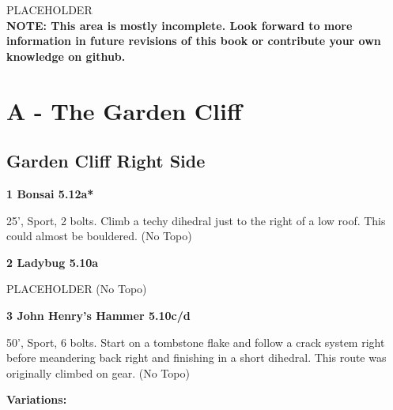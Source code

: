 \begin{multicols}{2}



PLACEHOLDER\\

\textbf{NOTE: This area is mostly incomplete. Look forward to more information in future revisions of this book or contribute your own knowledge on github.}\\


\newpage

\section{A - The Garden Cliff}\label{sa:The Garden Cliff}




\needspace{1.5cm}
\subsection*{Garden Cliff Right Side}\label{bf:Garden Cliff Right Side}
	


\needspace{1.5cm}
\label{rt:Bonsai}
\colorbox{Goldenrod!50}{
\parbox{0.95\linewidth}{
\textbf{
1 Bonsai 5.12a*  
}}}
\begin{adjustwidth}{0.5cm}{}			
25', Sport, 2 bolts. Climb a techy dihedral just to the right of a low roof. This could almost be bouldered.
  (No Topo)
\end{adjustwidth}




\needspace{1.5cm}
\label{rt:Ladybug}
\colorbox{RoyalBlue!20}{
\parbox{0.95\linewidth}{
\textbf{
2 Ladybug 5.10a  
}}}
\begin{adjustwidth}{0.5cm}{}			
PLACEHOLDER
  (No Topo)
\end{adjustwidth}




\needspace{1.5cm}
\label{rt:John Henry's Hammer}
\colorbox{RoyalBlue!20}{
\parbox{0.95\linewidth}{
\textbf{
3 John Henry's Hammer 5.10c/d  
}}}
\begin{adjustwidth}{0.5cm}{}			
50', Sport, 6 bolts. Start on a tombstone flake and follow a crack system right before meandering back right and finishing in a short dihedral. This route was originally climbed on gear.
  (No Topo)
\end{adjustwidth}


\begin{adjustwidth}{0.5cm}{}				
\needspace{3cm}
\textbf{Variations:} \newline


\end{adjustwidth}
\end{multicols}
